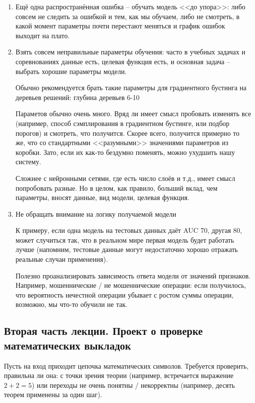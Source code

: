 \documentclass[main.tex]{subfiles}
\begin{document}
\begin{enumerate}[noitemsep]
	\item Ещё одна распространённая ошибка -- обучать модель <<до упора>>: либо совсем не следить за ошибкой и тем, как мы обучаем, либо не смотреть, в какой момент параметры почти перестают меняться и график ошибок выходит на плато.
	\item Взять совсем неправильные параметры обучения: часто в учебных задачах и соревнованиях данные есть, целевая функция есть, и основная задача -- выбрать хорошие параметры модели.

	Обычно рекомендуется брать такие параметры для градиентного бустинга на деревьев решений: глубина деревьев 6-10

	Параметов обычно очень много.
	Вряд ли имеет смысл пробовать изменять все (например, способ сэмплирования в градиентном бустинге, или подбор порогов) и смотреть, что получится.
	Скорее всего, получится примерно то же, что со стандартными <<разумными>> значениями параметров из коробки.
	Зато, если их как-то бездумно поменять, можно ухудшить нашу систему.

	Сложнее с нейронными сетями, где есть число слоёв и т.д., имеет смысл попробовать разные.
	Но в целом, как правило, больший вклад, чем параметры, вносят данные, вид модели, целевая функция.

	\item Не обращать внимание на логику получаемой модели

	К примеру, если одна модель на тестовых данных даёт AUC 70, другая 80, может случиться так, что в реальном мире первая модель будет работать лучше (напомним, тестовые данные могут недостаточно хорошо отражать реальные случаи применения).

	Полезно проанализировать зависимость ответа модели от значений признаков. Например, мошеннические / не мошеннические операции: если получилось, что вероятность нечестной операции убывает с ростом суммы операции, возможно, мы что-то обучили не так.

\end{enumerate}

\subsection{ Вторая часть лекции. Проект о проверке математических выкладок }

Пусть на вход приходит цепочка математических символов.
Требуется проверить, правильна ли она: с точки зрения теории (например, встречается выражение $ 2 + 2 = 5 $) или переходы не очень понятны / некорректны (например, десять теорем применены за один шаг).
\end{document}
